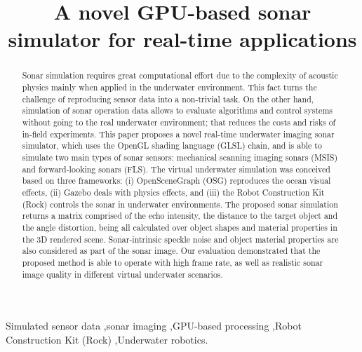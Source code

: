 \documentclass[final,5p,times]{elsarticle}
\begin{document}
\begin{frontmatter}


\title{A novel GPU-based sonar simulator for real-time applications}



\begin{abstract}

Sonar simulation requires great computational effort due to the complexity of
acoustic physics mainly when applied in the underwater environment. This fact turns the
challenge of reproducing sensor data into a non-trivial task. On the other
hand, simulation of sonar operation data allows to evaluate algorithms and
control systems without going to the real underwater environment; that reduces
the costs and risks of in-field experiments. This paper proposes a novel
real-time underwater imaging sonar simulator, which uses the OpenGL shading
language (GLSL) chain, and is able to simulate two main types of sonar sensors:
mechanical scanning imaging sonars (MSIS) and forward-looking sonars (FLS). The
virtual underwater simulation was conceived based on three frameworks: (i)
OpenSceneGraph (OSG) reproduces the ocean visual effects, (ii) Gazebo deals
with physics effects, and (iii) the Robot Construction Kit (Rock) controls the
sonar in underwater environments. The proposed sonar simulation returns a
matrix comprised of the echo intensity, the distance to the target object and
the angle distortion, being all calculated over object shapes and material
properties in the 3D rendered scene. Sonar-intrinsic speckle noise and object
material properties are also considered as part of the sonar image. Our
evaluation demonstrated that the proposed method is able to operate with high
frame rate, as well as realistic sonar image quality in different virtual
underwater scenarios.

\end{abstract}

\begin{keyword}
Simulated sensor data
\sep sonar imaging
\sep GPU-based processing
\sep Robot Construction Kit (Rock)
\sep Underwater robotics.

\end{keyword}

\end{frontmatter}
\end{document}
